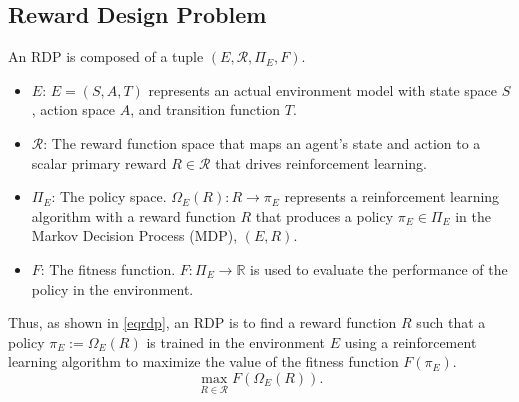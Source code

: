 \documentclass[lettersize,journal]{IEEEtran}
\begin{document}
\subsection{Reward Design Problem}
An RDP is composed of a tuple $(E,\mathcal{R},\Pi_E, F)$. 
\begin{itemize}
    \item [-] $E$: $E=(S,A,T)$ represents an actual environment model with state space $S$, action space $A$, and transition function $T$.
    \item [-] $\mathcal{R}$: The reward function space that maps an agent's state and action to a scalar primary reward $R \in \mathcal{R}$ that drives reinforcement learning. 
    \item [-] $\Pi_E$: The policy space. $\Omega_E(R):R\rightarrow \pi_E$ represents a reinforcement learning algorithm with a reward function $R$ that produces a policy $\pi_E \in \Pi_E$ in the Markov Decision Process (MDP), $(E,R)$. 
    \item [-] $F$: The fitness function. $F:\Pi_E\rightarrow \mathbb{R}$ is used to evaluate the performance of the policy in the environment. 
\end{itemize}
Thus, as shown in \eqref{eqrdp}, an RDP is to find a reward function $R$ such that a policy $\pi_E:= \Omega_E (R)$ is trained in the environment $E$ using a reinforcement learning algorithm to maximize the value of the fitness function $F(\pi_E)$.
\begin{equation}
    \label{eqrdp}
    \max \limits_{R \in \mathcal{R}} F(\Omega_E (R)).
\end{equation}
\end{document}
